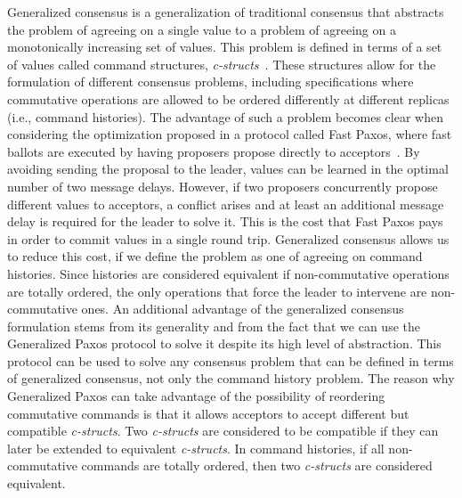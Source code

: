 Generalized consensus is a generalization of traditional consensus that abstracts the problem of agreeing on a single value to a problem of agreeing on a monotonically increasing set of values. This problem is defined in terms of a set of values called command structures, \textit{c-structs}~\cite{Lamport2005}. These structures allow for the formulation of different consensus problems, including specifications where commutative operations are allowed to be ordered differently at different replicas (i.e., command histories). The advantage of such a problem becomes clear when considering the optimization proposed in a protocol called Fast Paxos, where fast ballots are executed by having proposers propose directly to acceptors~\cite{Lamport2006}. By avoiding sending the proposal to the leader, values can be learned in the optimal number of two message delays. However, if two proposers concurrently propose different values to acceptors, a conflict arises and at least an additional message delay is required for the leader to solve it. This is the cost that Fast Paxos pays in order to commit values in a single round trip.  Generalized consensus allows us to reduce this cost, if we define the problem as one of agreeing on command histories. Since histories are considered equivalent if non-commutative operations are totally ordered, the only operations that force the leader to intervene are non-commutative ones. An additional advantage of the generalized consensus formulation stems from its generality and from the fact that we can use the Generalized Paxos protocol to solve it despite its high level of abstraction. This protocol can be used to solve any consensus problem that can be defined in terms of generalized consensus, not only the command history problem. The reason why Generalized Paxos can take advantage of the possibility of reordering commutative commands is that it allows acceptors to accept different but compatible \textit{c-structs}. Two \textit{c-structs} are considered to be compatible if they can later be extended to equivalent \textit{c-structs}. In command histories, if all non-commutative commands are totally ordered, then two \textit{c-structs} are considered equivalent. \par

